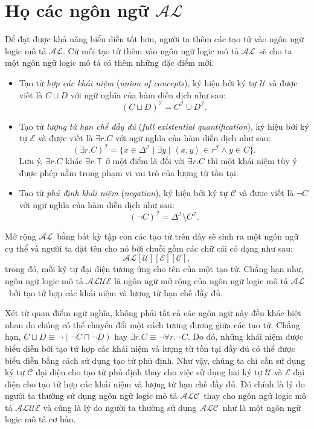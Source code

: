 \documentclass[12pt,a4paper]{report}
\newcommand{\mand}{\sqcap}
\newcommand{\mor}{\sqcup}
\newcommand{\V}{\forall}
\newcommand{\E}{\exists}
\newcommand{\AL}{$\mathcal{AL}$}
\newcommand{\ALC}{$\mathcal{ALC}$}
\newcommand{\mI}{\mathcal{I}}
\def\tuple#1{\left\langle#1\right\rangle}
\begin{document}
\section{Họ các ngôn ngữ \AL}
Để đạt được khả năng biểu diễn tốt hơn, người ta thêm các tạo tử vào ngôn ngữ logic mô tả \AL. Cứ mỗi tạo tử thêm vào ngôn ngữ logic mô tả \AL\ sẽ cho ta một ngôn ngữ logic mô tả có thêm những đặc điểm mới.
\begin{itemize}
  \item Tạo tử \textit{hợp các khái niệm} (\textit{union of concepts}), ký hiệu bởi ký tự $\mathcal{U}$ và được viết là $C \mor D$ với ngữ nghĩa của hàm diễn dịch như sau:
  $$(C \mor D)^\mI = C^\mI \cup D^\mI.$$
  
  \item Tạo tử \textit{lượng từ hạn chế đầy đủ} (\textit{full existential quantification}), ký hiệu bởi ký tự $\mathcal{E}$ và được viết là $\E r.C$ với ngữ nghĩa của hàm diễn dịch như sau:
  $$(\E r.C)^\mI = \{x \in \Delta^\mI \mid \E y \mid \tuple{x, y} \in r^\mI \wedge y \in C \}.$$
  Lưu ý, $\E r.C$ khác $\E r.\top$ ở một điểm là đối với $\E r.C$ thì một khái niệm tùy ý được phép nằm trong phạm vi vai trò của lượng từ tồn tại.
  
  \item Tạo tử \textit{phủ định khái niệm} (\textit{negation}), ký hiệu bởi ký tự $\mathcal{C}$ và được viết là $\neg C$ với ngữ nghĩa của hàm diễn dịch như sau: 
  $$(\neg C)^\mI = \Delta^\mI \setminus C^\mI.$$
\end{itemize}

Mở rộng \AL\ bằng bất kỳ tập con các tạo tử trên đây sẽ sinh ra một ngôn ngữ cụ thể và người ta đặt tên cho nó bởi chuỗi gồm các chữ cái có dạng như sau: $$\mathcal{AL}[\mathcal{U}][\mathcal{E}][\mathcal{C}],$$
trong đó, mỗi ký tự đại diện tương ứng cho tên của một tạo tử. Chẳng hạn như, ngôn ngữ logic mô tả $\mathcal{ALUE}$ là ngôn ngữ mở rộng của ngôn ngữ logic mô tả \AL\ bởi tạo tử hợp các khái niệm và lượng từ hạn chế đầy đủ.

Xét từ quan điểm ngữ nghĩa, không phải tất cả các ngôn ngữ này đều khác biệt nhau do chúng có thể chuyển đổi một cách tương đương giữa các tạo tử. Chẳng hạn, $C \mor D \equiv \neg(\neg C \mand \neg D)$ hay $\E r.C \equiv \neg \V r.\neg C$. Do đó, những khái niệm được biểu diễn bởi tạo tử hợp các khái niệm và lượng từ tồn tại đầy đủ có thể được biểu diễn bằng cách sử dụng tạo tử phủ định. Như vậy, chúng ta chỉ cần sử dụng ký tự $\mathcal{C}$ đại diện cho tạo tử phủ định thay cho việc sử dụng hai ký tự $\mathcal{U}$ và $\mathcal{E}$ đại diện cho tạo tử hợp các khái niệm và lượng từ hạn chế đầy đủ. Đó chính là lý do người ta thường sử dụng ngôn ngữ logic mô tả \ALC\ thay cho ngôn ngữ logic mô tả $\mathcal{ALUE}$ và cũng là lý do người ta thường sử dụng \ALC\ như là một ngôn ngữ logic mô tả cơ bản.
\end{document}
